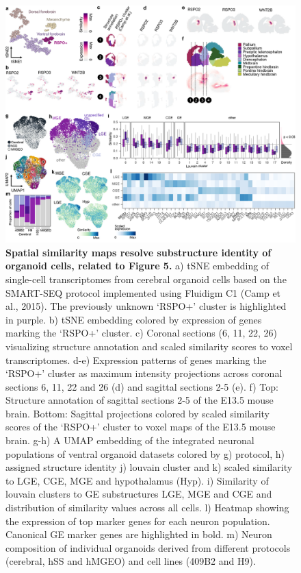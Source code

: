 \begin{figure}[h!]
    \centering
	\includegraphics[width=\textwidth]{figures/voxhunt/Supp_6}
    \caption{\textbf{Spatial similarity maps resolve substructure identity of organoid cells, related to Figure 5.} a) tSNE embedding of single-cell transcriptomes from cerebral organoid cells based on the SMART-SEQ protocol implemented using Fluidigm C1 (Camp et al., 2015).  The previously unknown ‘RSPO+’ cluster is highlighted in purple. b) tSNE embedding colored by expression of genes marking the ‘RSPO+’ cluster. c) Coronal sections (6, 11, 22, 26) visualizing structure annotation and scaled similarity scores to voxel transcriptomes. d-e) Expression patterns of genes marking the ‘RSPO+’ cluster as maximum intensity projections across coronal sections 6, 11, 22 and 26 (d) and sagittal sections 2-5 (e). f) Top: Structure annotation of sagittal sections 2-5 of the E13.5 mouse brain. Bottom: Sagittal projections colored by scaled similarity scores of the ‘RSPO+’ cluster to voxel maps of the E13.5 mouse brain. g-h) A UMAP embedding of the integrated neuronal populations of ventral organoid datasets colored by g) protocol, h) assigned structure identity j) louvain cluster and k) scaled similarity to LGE, CGE, MGE and hypothalamus (Hyp). i) Similarity of louvain clusters to GE substructures LGE, MGE and CGE and distribution of similarity values across all cells. l) Heatmap showing the expression of top marker genes for each neuron population. Canonical GE marker genes are highlighted in bold. m) Neuron composition of individual organoids derived from different protocols (cerebral, hSS and hMGEO) and cell lines (409B2 and H9).}
    \label{fig:voxS6}
\end{figure}

